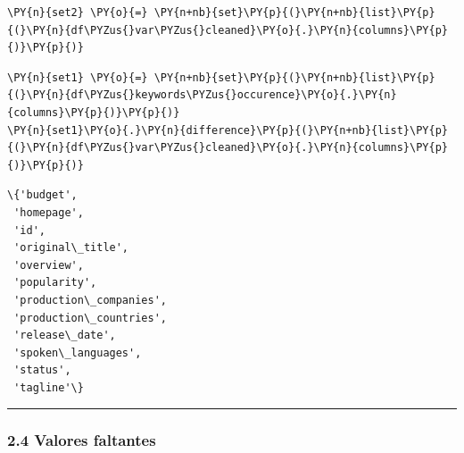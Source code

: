     \begin{tcolorbox}[breakable, size=fbox, boxrule=1pt, pad at break*=1mm,colback=cellbackground, colframe=cellborder]
\begin{Verbatim}[commandchars=\\\{\}]
\PY{n}{set2} \PY{o}{=} \PY{n+nb}{set}\PY{p}{(}\PY{n+nb}{list}\PY{p}{(}\PY{n}{df\PYZus{}var\PYZus{}cleaned}\PY{o}{.}\PY{n}{columns}\PY{p}{)}\PY{p}{)}
\end{Verbatim}
\end{tcolorbox}

    \begin{tcolorbox}[breakable, size=fbox, boxrule=1pt, pad at break*=1mm,colback=cellbackground, colframe=cellborder]
\begin{Verbatim}[commandchars=\\\{\}]
\PY{n}{set1} \PY{o}{=} \PY{n+nb}{set}\PY{p}{(}\PY{n+nb}{list}\PY{p}{(}\PY{n}{df\PYZus{}keywords\PYZus{}occurence}\PY{o}{.}\PY{n}{columns}\PY{p}{)}\PY{p}{)}
\PY{n}{set1}\PY{o}{.}\PY{n}{difference}\PY{p}{(}\PY{n+nb}{list}\PY{p}{(}\PY{n}{df\PYZus{}var\PYZus{}cleaned}\PY{o}{.}\PY{n}{columns}\PY{p}{)}\PY{p}{)}
\end{Verbatim}
\end{tcolorbox}

            \begin{tcolorbox}[breakable, boxrule=.5pt, size=fbox, pad at break*=1mm, opacityfill=0]
\begin{Verbatim}[commandchars=\\\{\}]
\{'budget',
 'homepage',
 'id',
 'original\_title',
 'overview',
 'popularity',
 'production\_companies',
 'production\_countries',
 'release\_date',
 'spoken\_languages',
 'status',
 'tagline'\}
\end{Verbatim}
\end{tcolorbox}
        
    \begin{center}\rule{0.5\linewidth}{\linethickness}\end{center}

\subsubsection{2.4 Valores faltantes}\label{valores-faltantes}

